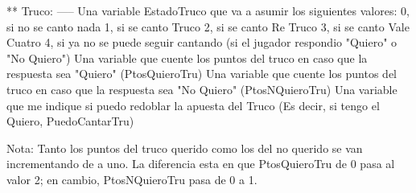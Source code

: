 ** Truco:
   -----
  Una variable EstadoTruco que va a asumir los siguientes valores:
    0, si no se canto nada
    1, si se canto Truco
    2, si se canto Re Truco
    3, si se canto Vale Cuatro
    4, si ya no se puede seguir cantando (si el jugador respondio "Quiero" o "No Quiero")
  Una variable que cuente los puntos del truco en caso que la respuesta sea "Quiero" (PtosQuieroTru)
  Una variable que cuente los puntos del truco en caso que la respuesta sea "No Quiero" (PtosNQuieroTru)
  Una variable que me indique si puedo redoblar la apuesta del Truco (Es decir, si tengo el Quiero, PuedoCantarTru)

Nota:
  Tanto los puntos del truco querido como los del no querido se van incrementando de a uno. La diferencia esta en que PtosQuieroTru de 0 pasa al valor 2; en cambio, PtosNQuieroTru pasa de 0 a 1.
